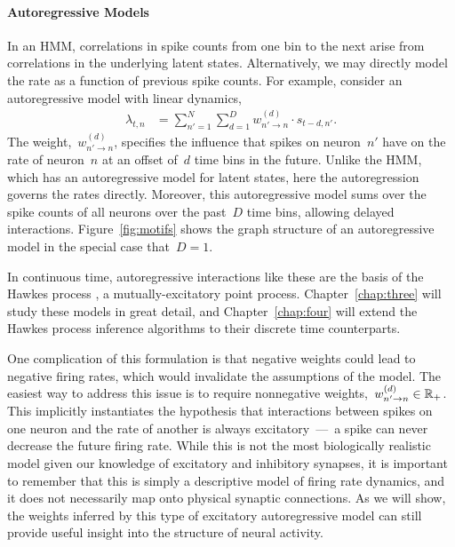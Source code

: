 \paragraph{Autoregressive Models}
In an HMM, correlations in spike counts from one bin to the next arise from 
correlations in the underlying latent states. Alternatively, we may directly 
model the rate as a function of previous spike counts. For example, consider 
an autoregressive model with linear dynamics,
\begin{align}
  \label{eq:ar_model}
  \lambda_{t,n} &= \sum_{n'=1}^N \sum_{d=1}^D w_{n' \to n}^{(d)} \cdot s_{t-d, n'}.
\end{align}
The weight,~$w_{n' \to n}^{(d)}$, specifies the influence that spikes
on neuron~$n'$ have on the rate of neuron~$n$ at an offset of~$d$ time bins
in the future. 
Unlike the HMM, which has an
autoregressive model for latent states, here the
autoregression governs the rates directly.
Moreover, this
autoregressive model sums over the spike counts of all neurons over
the past~$D$ time bins, allowing delayed interactions.
Figure~\ref{fig:motifs} shows the graph structure of an autoregressive model
in the special case that~$D=1$.

In continuous time, autoregressive interactions like these are the
basis of the Hawkes process \citep{Hawkes-1971}, a mutually-excitatory
point process. Chapter~\ref{chap:three} will study these models 
in great detail, and Chapter~\ref{chap:four} will extend the Hawkes
process inference algorithms to their discrete time counterparts.

One complication of this formulation is that negative weights could
lead to negative firing rates, which would invalidate the assumptions
of the model. The easiest way to address this issue is to require 
nonnegative weights,~$w_{n' \to n}^{(d)} \in \mathbb{R}_+$.  This implicitly
instantiates the hypothesis that interactions between spikes on one
neuron and the rate of another is always excitatory~---~a spike can
never decrease the future firing rate.  While this is not the most
biologically realistic model given our knowledge of excitatory and
inhibitory synapses, it is important to remember that this is simply a
descriptive model of firing rate dynamics, and it does not necessarily
map onto physical synaptic connections. As we will show, the weights
inferred by this type of excitatory autoregressive model can still
provide useful insight into the structure of neural activity.

